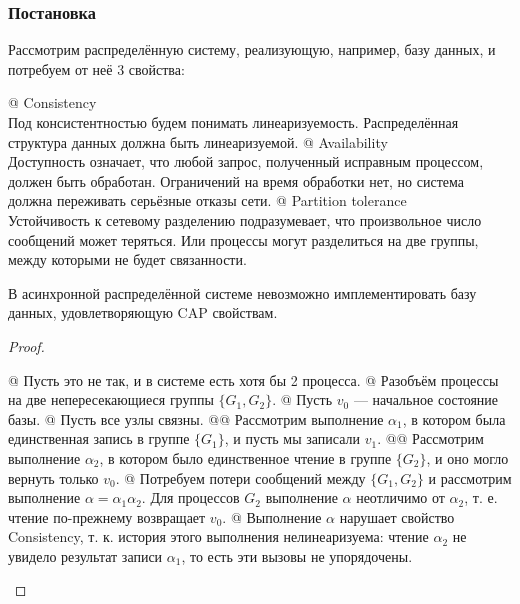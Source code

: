 \subsubsection{Постановка}
Рассмотрим распределённую систему, реализующую, например, базу данных, и потребуем от неё 3 свойства:
\begin{el}[ul]
@ Consistency \\
Под консистентностью будем понимать линеаризуемость. Распределённая структура данных должна быть линеаризуемой.
@ Availability \\
Доступность означает, что любой запрос, полученный исправным процессом, должен быть обработан. Ограничений на время обработки нет, но система должна переживать серьёзные отказы сети.
@ Partition tolerance \\
Устойчивость к сетевому разделению подразумевает, что произвольное число сообщений может теряться. Или процессы могут разделиться на две группы, между которыми не будет связанности.
\end{el}

\begin{thm}
В асинхронной распределённой системе невозможно имплементировать базу данных, удовлетворяющую CAP свойствам.
\end{thm}
\begin{proof}
\begin{el}[ul]
@ Пусть это не так, и в системе есть хотя бы 2 процесса.
@ Разобъём процессы на две непересекающиеся группы $\{G_1, G_2\}$.
@ Пусть $v_0$ — начальное состояние базы.
@ Пусть все узлы связны.
@@ Рассмотрим выполнение $\alpha_1$, в котором была единственная запись в группе $\{G_1\}$, и пусть мы записали $v_1$.
@@ Рассмотрим выполнение $\alpha_2$, в котором было единственное чтение в группе $\{G_2\}$, и оно могло вернуть только $v_0$.
@ Потребуем потери сообщений между $\{G_1, G_2\}$ и рассмотрим выполнение $\alpha = \alpha_1 \alpha_2$. Для процессов $G_2$ выполнение $\alpha$ неотличимо от $\alpha_2$, т. е. чтение по-прежнему возвращает $v_0$.
@ Выполнение $\alpha$ нарушает свойство Consistency, т. к. история этого выполнения нелинеаризуема: чтение $\alpha_2$ не увидело результат записи $\alpha_1$, то есть эти вызовы не упорядочены.
\end{el}
\end{proof}



